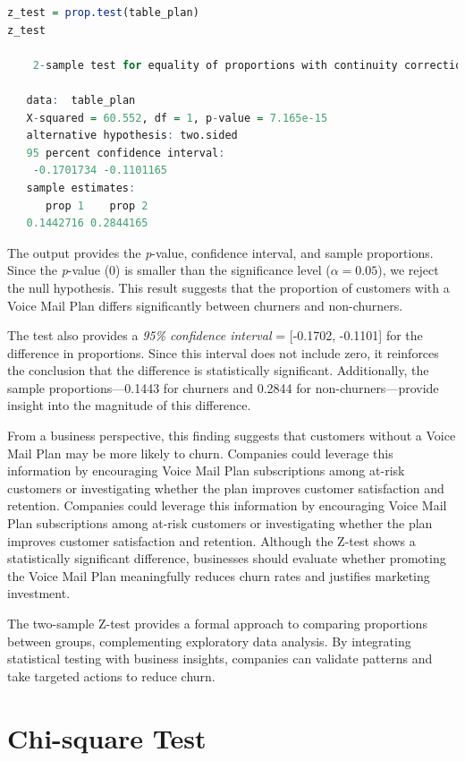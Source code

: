 \documentclass[
  11pt,
]{book}
\theoremstyle{definition}
\theoremstyle{definition}
\theoremstyle{definition}
\theoremstyle{definition}
\theoremstyle{remark}
\begin{document}
\begin{lstlisting}[language=R]
z_test = prop.test(table_plan)
z_test
   
    2-sample test for equality of proportions with continuity correction
   
   data:  table_plan
   X-squared = 60.552, df = 1, p-value = 7.165e-15
   alternative hypothesis: two.sided
   95 percent confidence interval:
    -0.1701734 -0.1101165
   sample estimates:
      prop 1    prop 2 
   0.1442716 0.2844165
\end{lstlisting}

The output provides the \emph{p}-value, confidence interval, and sample proportions. Since the \emph{p}-value (0) is smaller than the significance level (\(\alpha = 0.05\)), we reject the null hypothesis. This result suggests that the proportion of customers with a Voice Mail Plan differs significantly between churners and non-churners.

The test also provides a \emph{95\% confidence interval} = {[}-0.1702, -0.1101{]} for the difference in proportions. Since this interval does not include zero, it reinforces the conclusion that the difference is statistically significant. Additionally, the sample proportions---0.1443 for churners and 0.2844 for non-churners---provide insight into the magnitude of this difference.

From a business perspective, this finding suggests that customers without a Voice Mail Plan may be more likely to churn. Companies could leverage this information by encouraging Voice Mail Plan subscriptions among at-risk customers or investigating whether the plan improves customer satisfaction and retention. Companies could leverage this information by encouraging Voice Mail Plan subscriptions among at-risk customers or investigating whether the plan improves customer satisfaction and retention. Although the Z-test shows a statistically significant difference, businesses should evaluate whether promoting the Voice Mail Plan meaningfully reduces churn rates and justifies marketing investment.

The two-sample Z-test provides a formal approach to comparing proportions between groups, complementing exploratory data analysis. By integrating statistical testing with business insights, companies can validate patterns and take targeted actions to reduce churn.

\section{Chi-square Test}\label{chi-square-test}
\end{document}
